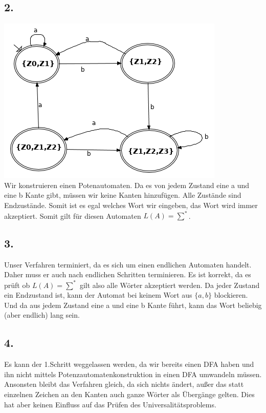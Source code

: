 \documentclass[a4paper,12pt]{scrartcl}
\begin{document}
\subsection*{2.}
\includegraphics[scale=0.5]{152.png}\\
Wir konstruieren einen Potenautomaten. Da es von jedem Zustand eine a und eine b Kante gibt, müssen wir keine Kanten hinzufügen. Alle Zustände sind Endzustände. Somit ist es egal welches Wort wir eingeben, das Wort wird immer akzeptiert. Somit gilt für diesen Automaten $L(A)=\sum^{*}$.
\subsection*{3.}
Unser Verfahren terminiert, da es sich um einen endlichen Automaten handelt. Daher muss er auch nach endlichen Schritten terminieren. Es ist korrekt, da es prüft ob $L(A)=\sum^{*}$ gilt also alle Wörter akzeptiert werden. Da jeder Zustand ein Endzustand ist, kann der Automat bei keinem Wort aus $\{a,b\}$ blockieren. Und da aus jedem Zustand eine a und eine b Kante führt, kann das Wort beliebig (aber endlich) lang sein.
\subsection*{4.}
Es kann der 1.Schritt weggelassen werden, da wir bereits einen DFA haben und ihn nicht mittels Potenzautomatenkonstruktion in einen DFA umwandeln müssen. Ansonsten bleibt das Verfahren gleich, da sich nichts ändert, außer das statt einzelnen Zeichen an den Kanten auch ganze Wörter als Übergänge gelten. Dies hat aber keinen Einfluss auf das Prüfen des Universalitätsproblems.
\end{document}
